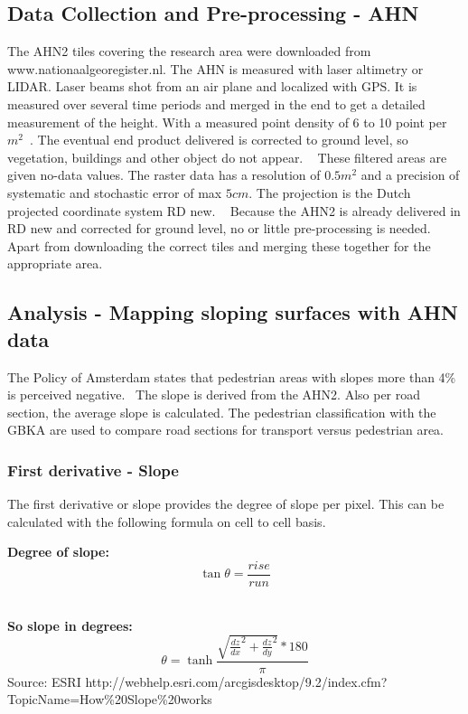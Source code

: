 \subsection{Data Collection and Pre-processing - AHN }
The AHN2 tiles covering the research area were downloaded from www.nationaalgeoregister.nl. The AHN is measured with laser altimetry or LIDAR. Laser beams shot from an air plane and localized with GPS. It is measured over several time periods and merged in the end to get a detailed measurement of the height. With a measured point density of 6 to 10 point per $m^2$~\cite{VanDerZon2013}. The eventual end product delivered is corrected to ground level, so vegetation, buildings and other object do not appear. ~\cite{VanDerZon2013} These filtered areas are given no-data values. The raster data has a resolution of $0.5m^2$ and a precision of systematic and stochastic error of max $5cm$. The projection is the Dutch projected coordinate system RD new. ~\cite{VanDerZon2013} Because the AHN2 is already delivered in RD new and corrected for ground level, no or little pre-processing is needed. Apart from downloading the correct tiles and merging these together for the appropriate area. 

\subsection{Analysis - Mapping sloping surfaces with AHN data}
The Policy of Amsterdam states that pedestrian areas with slopes more than 4\% is perceived negative.~\cite{leidraad2011}
The slope is derived from the AHN2. Also per road section, the average slope is calculated. The pedestrian classification with the GBKA are used to compare road sections for transport versus pedestrian area. 

\subsubsection{First derivative - Slope}
The first derivative or slope provides the degree of slope per pixel. This can be calculated with the following formula on cell to cell basis. 

\textbf{Degree of slope:}
\begin{equation}
\tan \theta = \frac{rise}{run}
\end{equation}
~\cite{ahnformula}

\textbf{So slope in degrees:}
\begin{equation}
\theta = \tanh \frac{\sqrt{\frac{dz}{dx}^2 + \frac{dz}{dy}^2 }*180 }{\pi}
\end{equation}
Source: ESRI 
http://webhelp.esri.com/arcgisdesktop/9.2/index.cfm?TopicName=How\%20Slope\%20works ~\cite{ahnformula}



